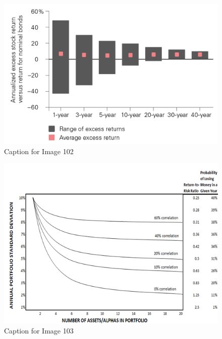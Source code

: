 \documentclass{article}
\begin{document}
\vspace{10pt}

\begin{figure}[!htb]
    \centering
    \includegraphics[width=\textwidth]{imgs/102.png}
    \caption{Caption for Image 102}
\end{figure}

\vspace{10pt}

\begin{figure}[!htb]
    \centering
    \includegraphics[width=\textwidth]{imgs/103.png}
    \caption{Caption for Image 103}
\end{figure}

\vspace{10pt}
\end{document}

